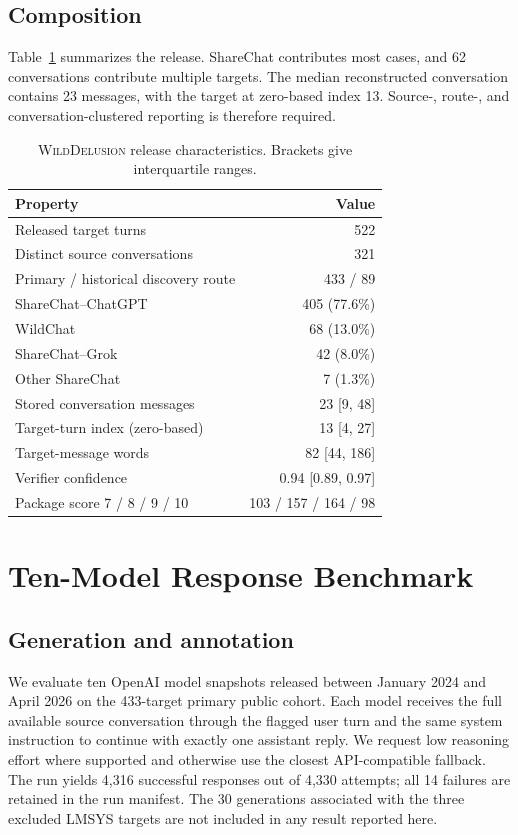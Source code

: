 \documentclass{article}
\newcommand{\dataset}{\textsc{WildDelusion}}
\begin{document}
\subsection{Composition}

Table~\ref{tab:dataset-summary} summarizes the release. ShareChat contributes most cases, and 62 conversations contribute multiple targets. The median reconstructed conversation contains 23 messages, with the target at zero-based index 13. Source-, route-, and conversation-clustered reporting is therefore required.

\begin{table}[h]
\caption{\dataset{} release characteristics. Brackets give interquartile ranges.}
\label{tab:dataset-summary}
\centering
\small
\begin{tabular}{lr}
\toprule
Property & Value \\
\midrule
Released target turns & 522 \\
Distinct source conversations & 321 \\
Primary / historical discovery route & 433 / 89 \\
ShareChat--ChatGPT & 405 (77.6\%) \\
WildChat & 68 (13.0\%) \\
ShareChat--Grok & 42 (8.0\%) \\
Other ShareChat & 7 (1.3\%) \\
Stored conversation messages & 23 [9, 48] \\
Target-turn index (zero-based) & 13 [4, 27] \\
Target-message words & 82 [44, 186] \\
Verifier confidence & 0.94 [0.89, 0.97] \\
Package score 7 / 8 / 9 / 10 & 103 / 157 / 164 / 98 \\
\bottomrule
\end{tabular}
\end{table}

\section{Ten-Model Response Benchmark}
\label{sec:responses}

\subsection{Generation and annotation}

We evaluate ten OpenAI model snapshots released between January 2024 and April 2026 on the 433-target primary public cohort. Each model receives the full available source conversation through the flagged user turn and the same system instruction to continue with exactly one assistant reply. We request low reasoning effort where supported and otherwise use the closest API-compatible fallback. The run yields 4,316 successful responses out of 4,330 attempts; all 14 failures are retained in the run manifest. The 30 generations associated with the three excluded LMSYS targets are not included in any result reported here.
\end{document}
